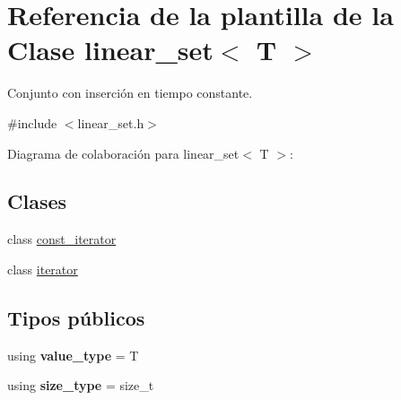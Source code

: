 \hypertarget{classlinear__set}{\section{Referencia de la plantilla de la Clase linear\+\_\+set$<$ T $>$}
\label{classlinear__set}
}


Conjunto con inserción en tiempo constante.  




{\ttfamily \#include $<$linear\+\_\+set.\+h$>$}



Diagrama de colaboración para linear\+\_\+set$<$ T $>$\+:
\subsection*{Clases}
\begin{DoxyCompactItemize}
\item 
class \hyperlink{classlinear__set_1_1const__iterator}{const\+\_\+iterator}
\item 
class \hyperlink{classlinear__set_1_1iterator}{iterator}
\end{DoxyCompactItemize}
\subsection*{Tipos públicos}
\begin{DoxyCompactItemize}
\item 
\hypertarget{classlinear__set_a3d7088f5ad3d506bc94ad0fa62c40fed}{using {\bfseries value\+\_\+type} = T}\label{classlinear__set_a3d7088f5ad3d506bc94ad0fa62c40fed}

\item 
\hypertarget{classlinear__set_a502855ac3cffe6a33ba8eed857bd14bf}{using {\bfseries size\+\_\+type} = size\+\_\+t}\label{classlinear__set_a502855ac3cffe6a33ba8eed857bd14bf}

\end{DoxyCompactItemize}
